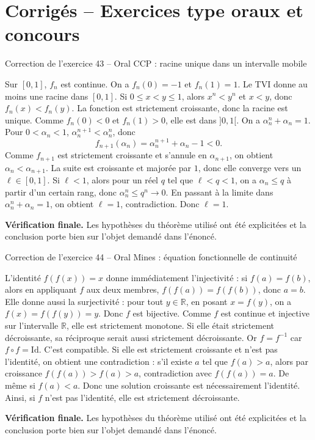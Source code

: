 \documentclass[11pt,a4paper]{article}
\newcommand{\R}{\mathbb{R}}
\newcommand{\Id}{\mathrm{Id}}
\begin{document}
\section{Corrigés -- Exercices type oraux et concours}
\begin{corrbox}{Correction de l'exercice 43 -- Oral CCP : racine unique dans un intervalle mobile}

Sur $[0,1]$, $f_n$ est continue. On a $f_n(0)=-1$ et $f_n(1)=1$. Le TVI donne au moins une racine dans $[0,1]$. Si $0\leq x<y\leq1$, alors $x^n<y^n$ et $x<y$, donc $f_n(x)<f_n(y)$. La fonction est strictement croissante, donc la racine est unique. Comme $f_n(0)<0$ et $f_n(1)>0$, elle est dans $]0,1[$.
On a $\alpha_n^n+\alpha_n=1$. Pour $0<\alpha_n<1$, $\alpha_n^{n+1}<\alpha_n^n$, donc
\[
f_{n+1}(\alpha_n)=\alpha_n^{n+1}+\alpha_n-1<0.
\]
Comme $f_{n+1}$ est strictement croissante et s'annule en $\alpha_{n+1}$, on obtient $\alpha_n<\alpha_{n+1}$. La suite est croissante et majorée par $1$, donc elle converge vers un $\ell\in[0,1]$. Si $\ell<1$, alors pour un réel $q$ tel que $\ell<q<1$, on a $\alpha_n\leq q$ à partir d'un certain rang, donc $\alpha_n^n\leq q^n\to0$. En passant à la limite dans $\alpha_n^n+\alpha_n=1$, on obtient $\ell=1$, contradiction. Donc $\ell=1$.

\medskip
\textbf{Vérification finale.} Les hypothèses du théorème utilisé ont été explicitées et la conclusion porte bien sur l'objet demandé dans l'énoncé.
\end{corrbox}


\begin{corrbox}{Correction de l'exercice 44 -- Oral Mines : équation fonctionnelle de continuité}

L'identité $f(f(x))=x$ donne immédiatement l'injectivité : si $f(a)=f(b)$, alors en appliquant $f$ aux deux membres, $f(f(a))=f(f(b))$, donc $a=b$. Elle donne aussi la surjectivité : pour tout $y\in\R$, en posant $x=f(y)$, on a $f(x)=f(f(y))=y$. Donc $f$ est bijective.
Comme $f$ est continue et injective sur l'intervalle $\R$, elle est strictement monotone. Si elle était strictement décroissante, sa réciproque serait aussi strictement décroissante. Or $f=f^{-1}$ car $f\circ f=\Id$. C'est compatible. Si elle est strictement croissante et n'est pas l'identité, on obtient une contradiction : s'il existe $a$ tel que $f(a)>a$, alors par croissance $f(f(a))>f(a)>a$, contradiction avec $f(f(a))=a$. De même si $f(a)<a$. Donc une solution croissante est nécessairement l'identité. Ainsi, si $f$ n'est pas l'identité, elle est strictement décroissante.

\medskip
\textbf{Vérification finale.} Les hypothèses du théorème utilisé ont été explicitées et la conclusion porte bien sur l'objet demandé dans l'énoncé.
\end{corrbox}
\end{document}
